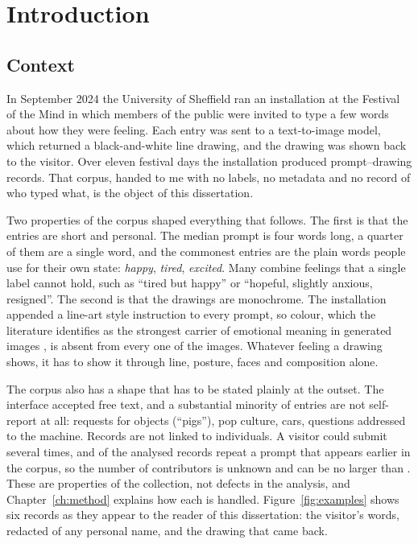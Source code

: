 \chapter{Introduction}
\label{ch:intro}

\section{Context}
\label{sec:intro-context}

In September 2024 the University of Sheffield ran an installation at the Festival of the Mind in which members of the public were invited to type a few words about how they were feeling. Each entry was sent to a text-to-image model, which returned a black-and-white line drawing, and the drawing was shown back to the visitor. Over eleven festival days the installation produced \nTotal{} prompt--drawing records. That corpus, handed to me with no labels, no metadata and no record of who typed what, is the object of this dissertation.

Two properties of the corpus shaped everything that follows. The first is that the entries are short and personal. The median prompt is four words long, a quarter of them are a single word, and the commonest entries are the plain words people use for their own state: \emph{happy}, \emph{tired}, \emph{excited}. Many combine feelings that a single label cannot hold, such as ``tired but happy'' or ``hopeful, slightly anxious, resigned''. The second is that the drawings are monochrome. The installation appended a line-art style instruction to every prompt, so colour, which the literature identifies as the strongest carrier of emotional meaning in generated images \cite{alvarado2025texttoimage}, is absent from every one of the \nTotal{} images. Whatever feeling a drawing shows, it has to show it through line, posture, faces and composition alone.

The corpus also has a shape that has to be stated plainly at the outset. The interface accepted free text, and a substantial minority of entries are not self-report at all: requests for objects (``pigs''), pop culture, cars, questions addressed to the machine. Records are not linked to individuals. A visitor could submit several times, and \nRepeats{} of the \nAnalysed{} analysed records repeat a prompt that appears earlier in the corpus, so the number of contributors is unknown and can be no larger than \nDistinct{}. These are properties of the collection, not defects in the analysis, and Chapter~\ref{ch:method} explains how each is handled. Figure~\ref{fig:examples} shows six records as they appear to the reader of this dissertation: the visitor's words, redacted of any personal name, and the drawing that came back.

